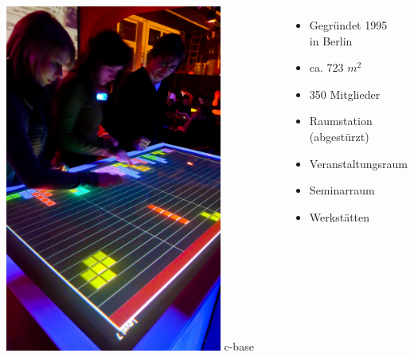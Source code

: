 \documentclass[aspectratio=1610]{beamer}
\begin{document}
  \begin{frame}
    \begin{columns}[l]
      \includegraphics[width=0.8\textwidth]{multitouch-tetris.jpg}
      c-base
      \begin{itemize}
        \item Gegründet 1995\\in Berlin
        \item ca. 723 $m^2$
        \item 350 Mitglieder
        \item Raumstation (abgestürzt)
        \item Veranstaltungsraum
        \item Seminarraum
        \item Werkstätten
      \end{itemize}
    \end{columns}
  \end{frame}
\end{document}
